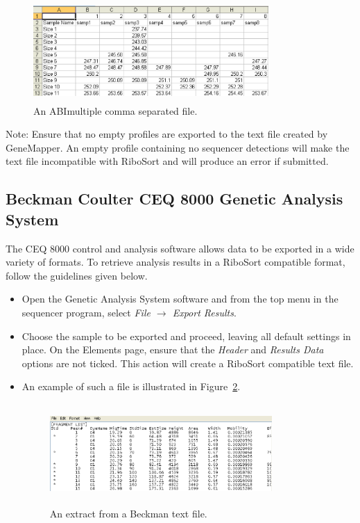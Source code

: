 \documentclass[a4paper]{article}
\begin{document}
\begin{itemize}
\begin{figure}
\centering
\includegraphics[width=0.8\textwidth,height=1.5in]{EPS/picabimultiplecsv.eps}
\caption{An ABImultiple comma separated file.}
\label{fig:abimultcsv}
\end{figure}

\end{itemize}
Note: Ensure that no empty profiles are exported to the text file created by GeneMapper. An empty profile containing no sequencer detections will make the text file incompatible with RiboSort and will produce an error if submitted. 
\subsection{\textbf{Beckman Coulter CEQ 8000 Genetic Analysis System}}
The CEQ 8000 control and analysis software allows data to be exported in a wide variety of formats. To retrieve analysis results in a RiboSort compatible format, follow the guidelines given below.
\begin{itemize}
\item Open the Genetic Analysis System software and from the top menu in the sequencer program, select {\em File $\rightarrow$ Export Results}.
\item Choose the sample to be exported and proceed, leaving all default settings in place. On the Elements page, ensure that the \textit{Header} and \textit{Results Data} options are not ticked. This action will create a RiboSort compatible text file.
\item  An example of such a file is illustrated in Figure~\ref{fig:beckman}.

\begin{figure}
\centering
\includegraphics[width=0.8\textwidth,height=1.5in]{EPS/picbeckman.eps}
\caption{An extract from a Beckman text file.}
\label{fig:beckman}
\end{figure}

\end{itemize}
\end{document}
